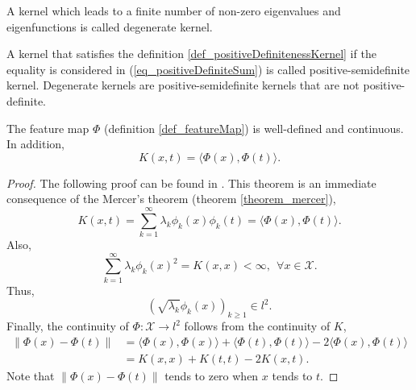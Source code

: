 \begin{definition} \label{def_degenerateKernel}
  A kernel which leads to a finite number of non-zero eigenvalues and eigenfunctions is called degenerate kernel.
\end{definition}

\begin{remark} \label{remark_semidefiniteDegenerateKernel}
    A kernel that satisfies the definition \ref{def_positiveDefinitenessKernel} if the equality is considered in (\ref{eq_positiveDefiniteSum}) is called positive-semidefinite kernel. Degenerate kernels are positive-semidefinite kernels that are not positive-definite.
\end{remark}

\begin{theorem} \label{theorem_kernelTrick}
  The feature map $\Phi$ (definition \ref{def_featureMap}) is well-defined and continuous. In addition,
  \begin{equation*}
    K(x,t) = \langle \Phi(x), \Phi(t) \rangle.
  \end{equation*}
  \begin{proof}
    The following proof can be found in \textcite{cucker2001}. 
    This theorem is an immediate consequence of the Mercer's theorem (theorem \ref{theorem_mercer}),
    \begin{equation*}
      K(x,t) = \sum_{k=1}^{\infty} \lambda_k \phi_k(x) \phi_k(t) = \langle \Phi(x), \Phi(t) \rangle.
    \end{equation*}
    Also,
    \begin{equation*}
      \sum_{k=1}^{\infty} \lambda_k \phi_k(x)^2 = K(x,x) < \infty , \ \ \forall x \in \mathcal{X}.
    \end{equation*}
    Thus, 
    \begin{equation*}
      (\sqrt{\lambda_k}\phi_k(x))_{k \geq 1} \in l^2.
    \end{equation*}
    Finally, the continuity of $\Phi : \mathcal{X} \to l^2$ follows from the continuity of $K$,
    \begin{equation*} %
      \begin{aligned}
        \| \Phi(x) - \Phi(t) \| &= \langle \Phi(x) , \Phi(x) \rangle
                                      + \langle \Phi(t) , \Phi(t) \rangle
                                      - 2\langle \Phi(x) , \Phi(t) \rangle \\
                                &= K(x,x) + K(t,t) - 2K(x,t).
      \end{aligned}
    \end{equation*}
    Note that $ \| \Phi(x) - \Phi(t) \|$ tends to zero when $x$ tends to $t$.
  \end{proof}
\end{theorem}

